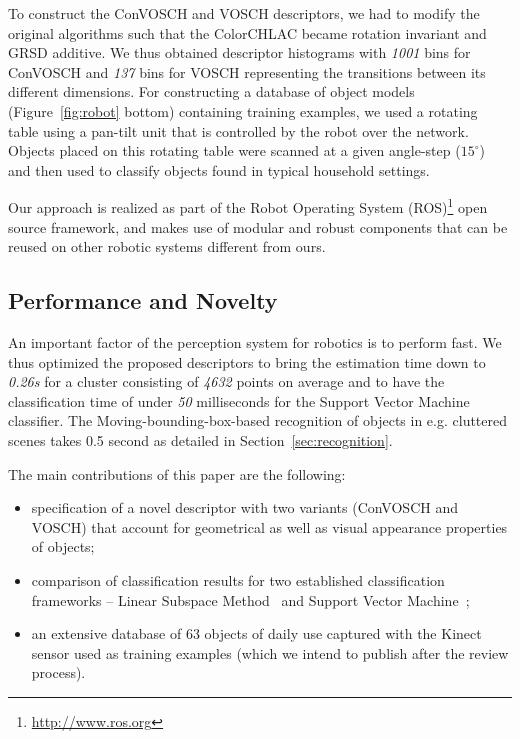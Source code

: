 \documentclass[conference]{sty/IEEEtran}
\begin{document}
To construct the ConVOSCH and VOSCH descriptors, we had to modify the original algorithms
such that the ColorCHLAC became rotation invariant and GRSD 
additive. We thus obtained descriptor histograms with 
\emph{1001} bins for ConVOSCH and \emph{137} bins for VOSCH representing the transitions between its different dimensions.
For constructing a database of object models (Figure~\ref{fig:robot} bottom)
containing training examples, we used a rotating
table using a pan-tilt unit that is controlled by the robot over the
network. Objects placed on this rotating table were scanned at a given
angle-step ($15^\circ$) and then used to classify objects found in
typical household settings.

Our approach is realized as part of the Robot Operating System
(ROS)\footnote{\url{http://www.ros.org}} open source framework, and makes
use of modular and robust components that can be reused on other robotic
systems different from ours.

\subsection{Performance and Novelty}
An important factor of the perception system for robotics is to perform fast. We thus optimized
the proposed descriptors to bring the estimation time down to \emph{0.26s} for a cluster consisting of 
\emph{4632} points on average and to have the classification time of under \emph{50} milliseconds
for the Support Vector Machine classifier. The Moving-bounding-box-based
recognition of objects in e.g. cluttered scenes takes 0.5 second as detailed
in Section~\ref{sec:recognition}.

The main contributions of this paper are the following:
\begin{itemize}
\item specification of a novel descriptor with two variants (ConVOSCH and VOSCH) that account for
geometrical as well as visual appearance  properties of objects;
\item comparison of classification results for two established classification
frameworks -- Linear Subspace Method~\cite{watanabe1973} and Support Vector Machine~\cite{svm99};
\item an extensive database of 63 objects of daily use captured with the Kinect sensor
used as training examples (which we intend to publish after the review process).
\end{itemize}
\end{document}
